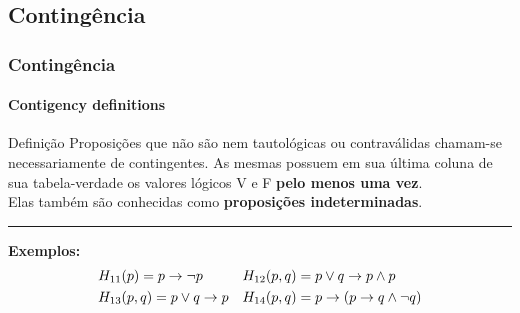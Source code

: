 \subsection{Contingência}
%
\begin{frame}[t]
    \frametitle{Contingência}
    \framesubtitle{Contigency definitions}
    \begin{alertblock}{Definição}
        \indent Proposições que não são nem tautológicas ou contraválidas chamam-se necessariamente de contingentes. As mesmas possuem em sua última coluna de sua tabela-verdade os valores lógicos V e F \textbf{pelo menos uma vez}.\\
        \hfill \break
        \indent Elas também são conhecidas como \textbf{proposições indeterminadas}. \\
        {\color{red} \rule{\linewidth}{0.5pt}}
        \textbf{Exemplos:}
        \begin{align*}
            &H_{11}(p) = p \rightarrow \lnot p                     &        & H_{12}(p,q) = p \lor q \rightarrow p \land p \\
            &H_{13}(p,q) = p \lor q \rightarrow p                &        & H_{14}(p,q) = p \rightarrow (p \rightarrow q \land \lnot q)
        \end{align*}
    \end{alertblock}
\end{frame}
%
